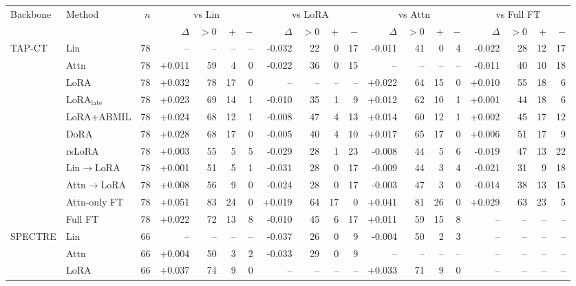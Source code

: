 \setlength{\tabcolsep}{3.5pt}
\begin{tabular}{@{}llrrrrrrrrrrrrrrrrr@{}}
\toprule
Backbone & Method & $n$ & \multicolumn{4}{c}{vs Lin} & \multicolumn{4}{c}{vs LoRA} & \multicolumn{4}{c}{vs Attn} & \multicolumn{4}{c}{vs Full FT} \\
\cmidrule(lr){4-7}\cmidrule(lr){8-11}\cmidrule(lr){12-15}\cmidrule(lr){16-19}
 & & & $\Delta$ & $>0$ & $+$ & $-$ & $\Delta$ & $>0$ & $+$ & $-$ & $\Delta$ & $>0$ & $+$ & $-$ & $\Delta$ & $>0$ & $+$ & $-$ \\
\midrule
TAP-CT & Lin & 78 & -- & -- & -- & -- & -0.032 & 22 & 0 & 17 & -0.011 & 41 & 0 & 4 & -0.022 & 28 & 12 & 17 \\
 & Attn & 78 & +0.011 & 59 & 4 & 0 & -0.022 & 36 & 0 & 15 & -- & -- & -- & -- & -0.011 & 40 & 10 & 18 \\
 & LoRA & 78 & +0.032 & 78 & 17 & 0 & -- & -- & -- & -- & +0.022 & 64 & 15 & 0 & +0.010 & 55 & 18 & 6 \\
 & LoRA$_{\text{late}}$ & 78 & +0.023 & 69 & 14 & 1 & -0.010 & 35 & 1 & 9 & +0.012 & 62 & 10 & 1 & +0.001 & 44 & 18 & 6 \\
 & LoRA+ABMIL & 78 & +0.024 & 68 & 12 & 1 & -0.008 & 47 & 4 & 13 & +0.014 & 60 & 12 & 1 & +0.002 & 45 & 17 & 12 \\
 & DoRA & 78 & +0.028 & 68 & 17 & 0 & -0.005 & 40 & 4 & 10 & +0.017 & 65 & 17 & 0 & +0.006 & 51 & 17 & 9 \\
 & rsLoRA & 78 & +0.003 & 55 & 5 & 5 & -0.029 & 28 & 1 & 23 & -0.008 & 44 & 5 & 6 & -0.019 & 47 & 13 & 22 \\
 & Lin$\to$LoRA & 78 & +0.001 & 51 & 5 & 1 & -0.031 & 28 & 0 & 17 & -0.009 & 44 & 3 & 4 & -0.021 & 31 & 9 & 18 \\
 & Attn$\to$LoRA & 78 & +0.008 & 56 & 9 & 0 & -0.024 & 28 & 0 & 17 & -0.003 & 47 & 3 & 0 & -0.014 & 38 & 13 & 15 \\
 & Attn-only FT & 78 & +0.051 & 83 & 24 & 0 & +0.019 & 64 & 17 & 0 & +0.041 & 81 & 26 & 0 & +0.029 & 63 & 23 & 5 \\
 & Full FT & 78 & +0.022 & 72 & 13 & 8 & -0.010 & 45 & 6 & 17 & +0.011 & 59 & 15 & 8 & -- & -- & -- & -- \\
\addlinespace
SPECTRE & Lin & 66 & -- & -- & -- & -- & -0.037 & 26 & 0 & 9 & -0.004 & 50 & 2 & 3 & -- & -- & -- & -- \\
 & Attn & 66 & +0.004 & 50 & 3 & 2 & -0.033 & 29 & 0 & 9 & -- & -- & -- & -- & -- & -- & -- & -- \\
 & LoRA & 66 & +0.037 & 74 & 9 & 0 & -- & -- & -- & -- & +0.033 & 71 & 9 & 0 & -- & -- & -- & -- \\

\end{tabular}
